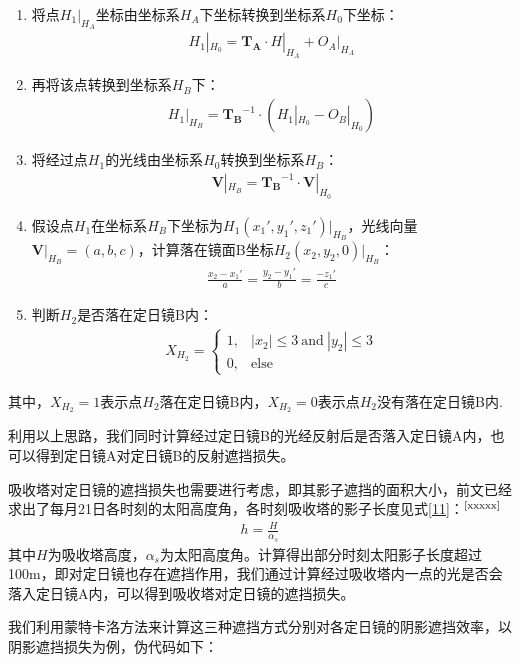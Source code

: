 \documentclass[withoutpreface,bwprint]{cumcmthesis} %
\begin{document}
\begin{enumerate}[label=$Step$ \arabic*:, leftmargin=*]
\item 将点$H_1|_{H_A}$坐标由坐标系$H_A$下坐标转换到坐标系$H_0$下坐标：
\begin{eqnarray}
H_1|_{H_0}=\mathbf{T_A}\cdot H|_{H_A}+O_A|_{H_A}
\end{eqnarray}
\item 再将该点转换到坐标系$H_B$下：
\begin{eqnarray}
H_1|_{H_B}=\mathbf{T_B}^{-1}\cdot (H_1|_{H_0}-O_B|_{H_0})
\end{eqnarray}
\item 将经过点$H_1$的光线由坐标系$H_0$转换到坐标系$H_B$：
\begin{eqnarray}
\mathbf{V}|_{H_B}=\mathbf{T_B}^{-1}\cdot \mathbf{V}|_{H_0}
\end{eqnarray}
\item 假设点$H_1$在坐标系$H_B$下坐标为$H_1(x_1',y_1',z_1')|_{H_B}$，光线向量$\mathbf{V}|_{H_B}=(a,b,c)$，计算落在镜面B坐标$H_2(x_2,y_2,0)|_{H_B}$：
\begin{eqnarray}
\frac{x_2-x_1'}{a}=\frac{y_2-y_1'}{b}=\frac{-z_1'}{c}
\end{eqnarray}
\item 判断$H_2$是否落在定日镜B内：
\begin{eqnarray}
X_{H_2}=\left\{\begin{matrix}
 1,&|x_2|\le 3\ \text{and}\ |y_2|\le 3\\
0,&\text{else}
\end{matrix}\right.
\end{eqnarray}
\end{enumerate}
其中，$X_{H_2}=1$表示点$H_2$落在定日镜B内，$X_{H_2}=0$表示点$H_2$没有落在定日镜B内.

利用以上思路，我们同时计算经过定日镜B的光经反射后是否落入定日镜A内，也可以得到定日镜A对定日镜B的反射遮挡损失。

吸收塔对定日镜的遮挡损失也需要进行考虑，即其影子遮挡的面积大小，前文已经求出了每月21日各时刻的太阳高度角，各时刻吸收塔的影子长度见式\eqref{11}：$^\text{\cite{xxxxx}}$
\begin{eqnarray}
h=\frac{H}{\alpha_s}\label{11}
\end{eqnarray}
其中$H$为吸收塔高度，$\alpha_s$为太阳高度角。计算得出部分时刻太阳影子长度超过100m，即对定日镜也存在遮挡作用，我们通过计算经过吸收塔内一点的光是否会落入定日镜A内，可以得到吸收塔对定日镜的遮挡损失。

我们利用蒙特卡洛方法来计算这三种遮挡方式分别对各定日镜的阴影遮挡效率，以阴影遮挡损失为例，伪代码如下：
\end{document}
